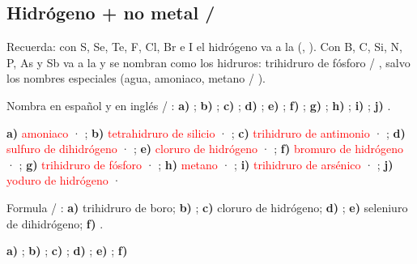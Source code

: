 \subsection{Hidrógeno + no metal / }

Recuerda: con S, Se, Te, F, Cl, Br e I el hidrógeno va a la  (, ). Con B, C, Si, N, P, As y Sb va a la  y se nombran como los hidruros:  trihidruro de fósforo / , salvo los nombres especiales (agua, amoniaco, metano / ).

\begin{exercise}
    Nombra en español y en inglés / : \textbf{a)} ; \textbf{b)} ; \textbf{c)} ; \textbf{d)} ; \textbf{e)} ; \textbf{f)} ; \textbf{g)} ; \textbf{h)} ; \textbf{i)} ; \textbf{j)} .
    \begin{solu}
        \textbf{a)} \textcolor{red}{amoniaco} · \textcolor{red}{}; \textbf{b)} \textcolor{red}{tetrahidruro de silicio} · \textcolor{red}{}; \textbf{c)} \textcolor{red}{trihidruro de antimonio} · \textcolor{red}{}; \textbf{d)} \textcolor{red}{sulfuro de dihidrógeno} · \textcolor{red}{}; \textbf{e)} \textcolor{red}{cloruro de hidrógeno} · \textcolor{red}{}; \textbf{f)} \textcolor{red}{bromuro de hidrógeno} · \textcolor{red}{}; \textbf{g)} \textcolor{red}{trihidruro de fósforo} · \textcolor{red}{}; \textbf{h)} \textcolor{red}{metano} · \textcolor{red}{}; \textbf{i)} \textcolor{red}{trihidruro de arsénico} · \textcolor{red}{}; \textbf{j)} \textcolor{red}{yoduro de hidrógeno} · \textcolor{red}{}
    \end{solu}
\end{exercise}

\begin{exercise}
    Formula / : \textbf{a)} trihidruro de boro; \textbf{b)} ; \textbf{c)} cloruro de hidrógeno; \textbf{d)} ; \textbf{e)} seleniuro de dihidrógeno; \textbf{f)} .
    \begin{solu}
        \textbf{a)} \textcolor{red}{}; \textbf{b)} \textcolor{red}{}; \textbf{c)} \textcolor{red}{}; \textbf{d)} \textcolor{red}{}; \textbf{e)} \textcolor{red}{}; \textbf{f)} \textcolor{red}{}
    \end{solu}
\end{exercise}

